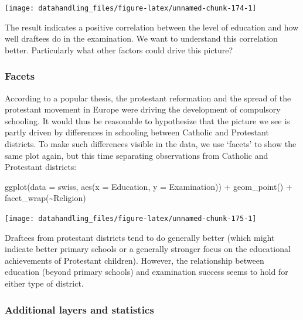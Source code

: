\documentclass[
  12pt,
]{style/krantz}
\newenvironment{Shaded}{\begin{snugshade}}{\end{snugshade}}
\newcommand{\AttributeTok}[1]{\textcolor[rgb]{0.77,0.63,0.00}{#1}}
\newcommand{\FunctionTok}[1]{\textcolor[rgb]{0.00,0.00,0.00}{#1}}
\newcommand{\NormalTok}[1]{#1}
\newcommand{\SpecialCharTok}[1]{\textcolor[rgb]{0.00,0.00,0.00}{#1}}
\begin{document}
\texttt{[image: datahandling\_files/figure-latex/unnamed-chunk-174-1]}

The result indicates a positive correlation between the level of education and how well draftees do in the examination. We want to understand this correlation better. Particularly what other factors could drive this picture?

\hypertarget{facets}{%
\subsubsection{Facets}\label{facets}}

According to a popular thesis, the protestant reformation and the spread of the protestant movement in Europe were driving the development of compulsory schooling. It would thus be reasonable to hypothesize that the picture we see is partly driven by differences in schooling between Catholic and Protestant districts. To make such differences visible in the data, we use `facets' to show the same plot again, but this time separating observations from Catholic and Protestant districts:

\begin{Shaded}
\begin{Highlighting}[]
\FunctionTok{ggplot}\NormalTok{(}\AttributeTok{data =}\NormalTok{ swiss, }\FunctionTok{aes}\NormalTok{(}\AttributeTok{x =}\NormalTok{ Education, }\AttributeTok{y =}\NormalTok{ Examination)) }\SpecialCharTok{+}
     \FunctionTok{geom\_point}\NormalTok{() }\SpecialCharTok{+}
     \FunctionTok{facet\_wrap}\NormalTok{(}\SpecialCharTok{\textasciitilde{}}\NormalTok{Religion)}
\end{Highlighting}
\end{Shaded}

\texttt{[image: datahandling\_files/figure-latex/unnamed-chunk-175-1]}

Draftees from protestant districts tend to do generally better (which might indicate better primary schools or a generally stronger focus on the educational achievements of Protestant children). However, the relationship between education (beyond primary schools) and examination success seems to hold for either type of district.

\hypertarget{additional-layers-and-statistics}{%
\subsubsection{Additional layers and statistics}\label{additional-layers-and-statistics}}
\end{document}
